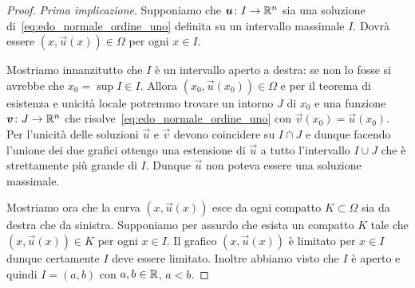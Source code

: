 \begin{proof}
\emph{Prima implicazione}.
Supponiamo che $\boldsymbol u\colon I \to \mathbb R^n$ sia una soluzione di~\eqref{eq:edo_normale_ordine_uno} definita su un intervallo massimale $I$. Dovrà essere $(x,\vec u(x))\in \Omega$ per ogni $x\in I$.

Mostriamo innanzitutto
che $I$ è un intervallo aperto a destra: se non lo fosse si avrebbe che $x_0=\sup I \in I$. Allora $(x_0,\vec u(x_0))\in \Omega$ e per il teorema di esistenza e unicità locale
potremmo trovare un intorno $J$ di $x_0$ e una funzione
$\boldsymbol v\colon J\to \mathbb R^n$ che risolve~\eqref{eq:edo_normale_ordine_uno}
con $\vec v(x_0)=\vec u(x_0)$.
Per l'unicità delle soluzioni $\vec u$ e $\vec v$ devono coincidere su $I\cap J$ e dunque facendo l'unione dei due grafici ottengo una estensione di $\vec u$ a tutto l'intervallo
$I\cup J$ che è strettamente più grande di $I$. Dunque $\vec u$ non poteva essere una soluzione massimale.

Mostriamo ora che la curva $(x,\vec u(x))$ esce da ogni compatto $K\subset \Omega$ sia da destra che da sinistra. Supponiamo per assurdo che esista un compatto $K$ tale che $(x,\vec u(x))\in K$ per ogni $x\in I$.
Il grafico $(x,\vec u(x))$ è limitato per $x\in I$ dunque certamente $I$ deve essere limitato. Inoltre abbiamo visto che $I$ è aperto e quindi $I=(a,b)$ con $a,b\in \mathbb R$, $a<b$.


\end{proof}
